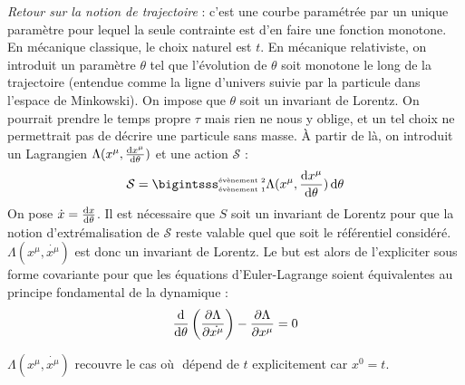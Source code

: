 {\txt \emph{Retour sur la notion de trajectoire }: c'est une courbe paramétrée par un unique paramètre pour lequel la seule contrainte est d'en faire une fonction monotone. En mécanique classique, le choix naturel est $t$. En mécanique relativiste, on introduit un paramètre $\theta$ tel que l'évolution de $\theta$ soit monotone le long de la trajectoire (entendue comme la ligne d'univers suivie par la particule dans l'espace de Minkowski). On impose que $\theta$ soit un invariant de Lorentz. On pourrait prendre le temps propre $\tau$ mais rien ne nous y oblige, et un tel choix ne permettrait pas de décrire une particule sans masse. À partir de là, on introduit un Lagrangien $\Lambda(x^\mu,\frac{\mathrm{d} x^\mu}{\mathrm{d}\theta})$ et une action $\mathcal{S}$ :}
$$
	\mathcal{S}=\bigintsss_{\text{\tiny évènement 1}}^{\text{\tiny évènement 2}} \Lambda(x^\mu,\frac{\dif x^\mu}{\dif\theta})\,\dif\theta
$$
{\txt On pose $\dot{x}=\frac{\mathrm{d} x}{\mathrm{d}\theta}$. Il est nécessaire que $S$ soit un invariant de Lorentz pour que la notion d'extrémalisation de $\mathcal{S}$ reste valable quel que soit le référentiel considéré. $\Lambda(x^\mu,\dot{x^\mu})$ est donc un invariant de Lorentz. Le but est alors de l'expliciter sous forme covariante pour que les équations d'Euler-Lagrange soient équivalentes au principe fondamental de la dynamique :}
$$
	\frac{\mathrm{d}}{\mathrm{d}\theta}\left(\frac{\partial \Lambda}{\partial\dot{x^\mu}}\right)-\frac{\partial\Lambda}{\partial x^\mu}=0
$$ 
\begin{remark}
	$\Lambda(x^\mu,\dot{x^\mu})$ recouvre le cas où $ $ dépend de $t$ explicitement car $x^0=t$.
\end{remark}

